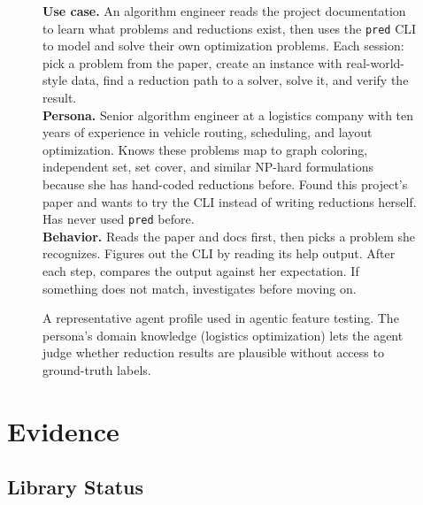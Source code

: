 \documentclass[conference]{IEEEtran}
\begin{document}
\begin{figure}[t]
  \centering
  \begin{tcolorbox}[
    colback=gray!5, colframe=gray!80,
    title={\textbf{Agent Profile:} Dr.\ Sarah Chen --- CLI Tool (\texttt{pred})},
    fonttitle=\small, boxrule=0.4pt, arc=2pt, left=4pt, right=4pt, top=2pt, bottom=2pt
  ]
  \small
  \textbf{Use case.}
  An algorithm engineer reads the project documentation to learn what problems and reductions exist, then uses the \texttt{pred} CLI to model and solve their own optimization problems.
  Each session: pick a problem from the paper, create an instance with real-world-style data, find a reduction path to a solver, solve it, and verify the result.\\[4pt]
  \textbf{Persona.}
  Senior algorithm engineer at a logistics company with ten years of experience in vehicle routing, scheduling, and layout optimization.
  Knows these problems map to graph coloring, independent set, set cover, and similar NP-hard formulations because she has hand-coded reductions before.
  Found this project's paper and wants to try the CLI instead of writing reductions herself.
  Has never used \texttt{pred} before.\\[4pt]
  \textbf{Behavior.}
  Reads the paper and docs first, then picks a problem she recognizes.
  Figures out the CLI by reading its help output.
  After each step, compares the output against her expectation.
  If something does not match, investigates before moving on.
  \end{tcolorbox}
  \caption{A representative agent profile used in agentic feature testing.
    The persona's domain knowledge (logistics optimization) lets the agent judge whether reduction results are plausible without access to ground-truth labels.}
  \label{fig:agent-profile}
\end{figure}

\section{Evidence}\label{sec:evidence}


\subsection{Library Status}
\end{document}
